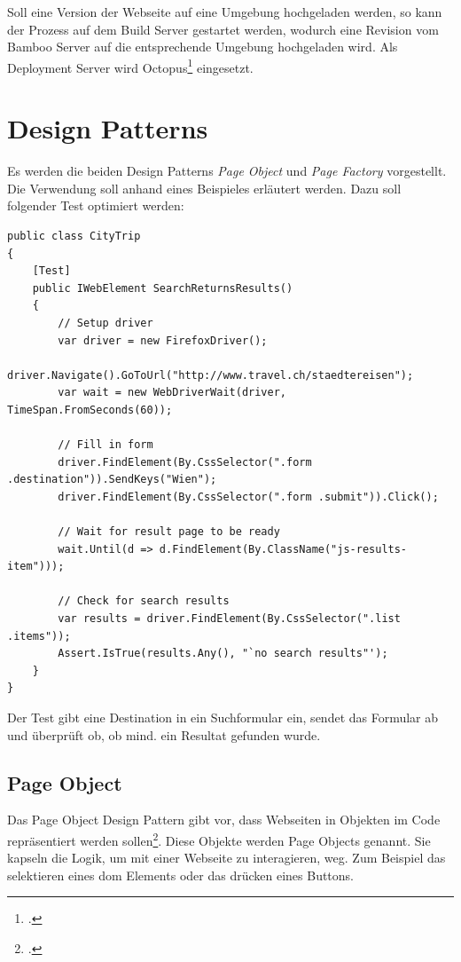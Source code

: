 Soll eine Version der Webseite auf eine Umgebung hochgeladen werden, so kann der Prozess auf dem Build Server gestartet werden, wodurch eine Revision vom Bamboo Server auf die entsprechende Umgebung hochgeladen wird. Als Deployment Server wird Octopus\footcite{Octopus_Deploy_2015-09-28} eingesetzt.

\section{Design Patterns}
Es werden die beiden Design Patterns \textit{Page Object} und \textit{Page Factory} vorgestellt. Die Verwendung soll anhand eines Beispieles erläutert werden. Dazu soll folgender Test optimiert werden:

\begin{lstlisting}        
public class CityTrip
{	    	
	[Test]
	public IWebElement SearchReturnsResults() 
	{
		// Setup driver
		var driver = new FirefoxDriver();
		driver.Navigate().GoToUrl("http://www.travel.ch/staedtereisen");
		var wait = new WebDriverWait(driver, TimeSpan.FromSeconds(60));
		
		// Fill in form
		driver.FindElement(By.CssSelector(".form .destination")).SendKeys("Wien");
		driver.FindElement(By.CssSelector(".form .submit")).Click();
		
		// Wait for result page to be ready
		wait.Until(d => d.FindElement(By.ClassName("js-results-item")));
		
		// Check for search results
		var results = driver.FindElement(By.CssSelector(".list .items"));
		Assert.IsTrue(results.Any(), "`no search results"');
	}
}
\end{lstlisting}

Der Test gibt eine Destination in ein Suchformular ein, sendet das Formular ab und überprüft ob, ob mind. ein Resultat gefunden wurde.

\subsection{Page Object}
\label{sec:umsetzung:patterns:pageobject}
Das Page Object Design Pattern gibt vor, dass Webseiten in Objekten im Code repräsentiert werden sollen\footcite{PageObjects}. Diese Objekte werden Page Objects genannt. Sie kapseln die Logik, um mit einer Webseite zu interagieren, weg. Zum Beispiel das selektieren eines \gls{dom} Elements oder das drücken eines Buttons.

